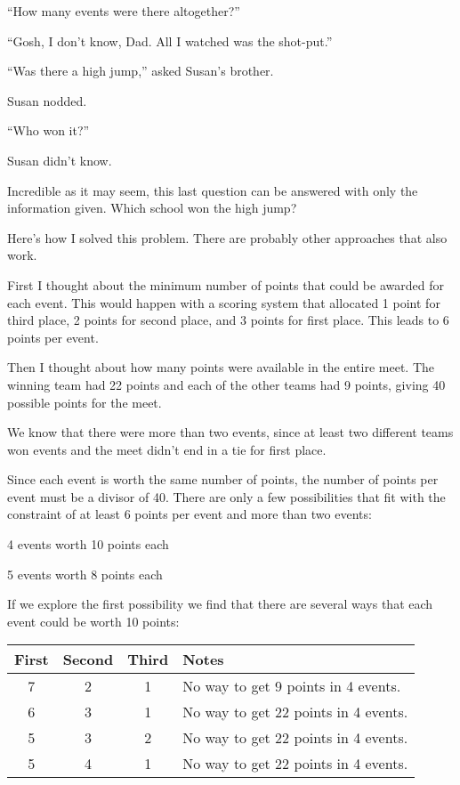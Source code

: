 \documentclass[fleqn,addpoints]{exam}
\begin{document}
\begin{questions}
``How many events were there altogether?''

``Gosh, I don't know, Dad.  All I watched was the shot-put.''

``Was there a high jump,'' asked Susan's brother.

Susan nodded.

``Who won it?''

Susan didn't know.

Incredible as it may seem, this last question can be answered with only the information given.  Which school won the
high jump?

\begin{solution}

Here's how I solved this problem.  There are probably other approaches that also work.

First I thought about the minimum number of points that could be awarded for each event.  This would happen with a
scoring system that allocated 1 point for third place, 2 points for second place, and 3 points for first place.  This
leads to 6 points per event.

Then I thought about how many points were available in the entire meet.  The winning team had 22 points and each of the
other teams had 9 points, giving 40 possible points for the meet.

We know that there were more than two events, since at least two different teams won events and the meet didn't end in a
tie for first place.

Since each event is worth the same number of points, the number of points per event must be a divisor of 40.  There are
only a few possibilities that fit with the constraint of at least 6 points per event and more than two events:

\begin{itemize*} 
  \item 4 events worth 10 points each
  \item 5 events worth 8 points each 
\end{itemize*} 

If we explore the first possibility we find that there are several ways that each event could be worth 10 points:

\begin{tabular}{ | c | c | c | p{4 cm} | }
  \hline
  First & Second & Third & Notes \\
  \hline
  7 & 2 & 1 & No way to get 9 points in 4 events.   \\
  6 & 3 & 1 & No way to get 22 points in 4 events.   \\
  5 & 3 & 2 & No way to get 22 points in 4 events.   \\
  5 & 4 & 1 & No way to get 22 points in 4 events.   \\
  \hline
\end{tabular}


\end{solution}
\end{questions}
\end{document}
